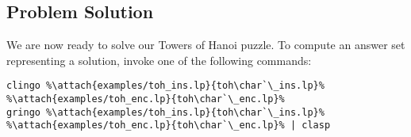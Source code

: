 \subsection{Problem Solution}

We are now ready to solve our Towers of Hanoi puzzle. 
To compute an answer set representing a solution,
invoke one of the following commands:%
%
\begin{lstlisting}[numbers=none,escapechar=\%]
clingo %\attach{examples/toh_ins.lp}{toh\char`\_ins.lp}% %\attach{examples/toh_enc.lp}{toh\char`\_enc.lp}%
gringo %\attach{examples/toh_ins.lp}{toh\char`\_ins.lp}% %\attach{examples/toh_enc.lp}{toh\char`\_enc.lp}% | clasp
\end{lstlisting}

